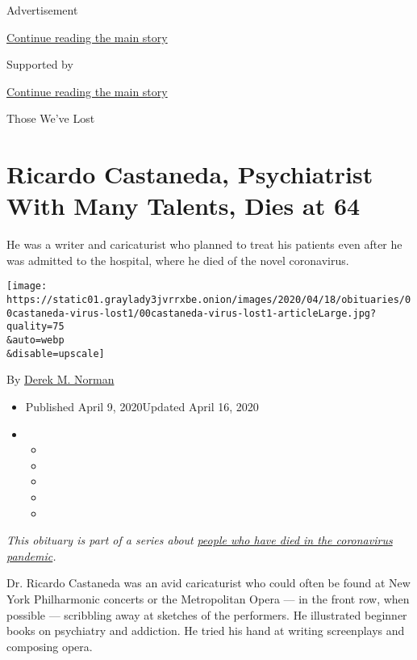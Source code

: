 Advertisement

\protect\hyperlink{after-top}{Continue reading the main story}

Supported by

\protect\hyperlink{after-sponsor}{Continue reading the main story}

Those We've Lost

\hypertarget{ricardo-castaneda-psychiatrist-with-many-talents-dies-at-64}{%
\section{Ricardo Castaneda, Psychiatrist With Many Talents, Dies at
64}\label{ricardo-castaneda-psychiatrist-with-many-talents-dies-at-64}}

He was a writer and caricaturist who planned to treat his patients even
after he was admitted to the hospital, where he died of the novel
coronavirus.

\texttt{[image: https://static01.graylady3jvrrxbe.onion/images/2020/04/18/obituaries/00castaneda-virus-lost1/00castaneda-virus-lost1-articleLarge.jpg?quality=75\\\&auto=webp\\\&disable=upscale]}

By \href{https://www.nytimes3xbfgragh.onion/by/derek-m-norman}{Derek M.
Norman}

\begin{itemize}
\item
  Published April 9, 2020Updated April 16, 2020
\item
  \begin{itemize}
  \item
  \item
  \item
  \item
  \item
  \end{itemize}
\end{itemize}

\emph{This obituary is part of a series about}
\href{https://www.nytimes3xbfgragh.onion/series/people-who-have-died-of-the-coronavirus}{\emph{people
who have died in the coronavirus pandemic}}\emph{.}

Dr. Ricardo Castaneda was an avid caricaturist who could often be found
at New York Philharmonic concerts or the Metropolitan Opera --- in the
front row, when possible --- scribbling away at sketches of the
performers. He illustrated beginner books on psychiatry and addiction.
He tried his hand at writing screenplays and composing opera.

